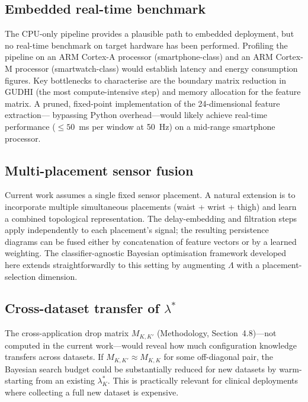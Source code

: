 \documentclass[onluarkali,ingilizce,yukseklisans,karton,LisansustuEgitim]{itutez}
\providecommand{\1}{\mathbf{1}}
\begin{document}
\subsection{Embedded real-time benchmark}

The CPU-only pipeline provides a plausible path to embedded deployment, but no
real-time benchmark on target hardware has been performed.  Profiling the pipeline
on an ARM Cortex-A processor (smartphone-class) and an ARM Cortex-M processor
(smartwatch-class) would establish latency and energy consumption figures.  Key
bottlenecks to characterise are the boundary matrix reduction in GUDHI (the
most compute-intensive step) and memory allocation for the feature matrix.  A
pruned, fixed-point implementation of the 24-dimensional feature extraction---
bypassing Python overhead---would likely achieve real-time performance ($\leq50$~ms
per window at 50~Hz) on a mid-range smartphone processor.

\subsection{Multi-placement sensor fusion}

Current work assumes a single fixed sensor placement.  A natural extension is to
incorporate multiple simultaneous placements (waist + wrist + thigh) and learn a
combined topological representation.  The delay-embedding and filtration steps apply
independently to each placement's signal; the resulting persistence diagrams can be
fused either by concatenation of feature vectors or by a learned weighting.  The
classifier-agnostic Bayesian optimisation framework developed here extends
straightforwardly to this setting by augmenting $\Lambda$ with a placement-selection
dimension.

\subsection{Cross-dataset transfer of $\lambda^*$}

The cross-application drop matrix $M_{K,K'}$ (Methodology, Section~4.8)---not
computed in the current work---would reveal how much configuration knowledge
transfers across datasets.  If $M_{K,K'}\approx M_{K,K}$ for some off-diagonal
pair, the Bayesian search budget could be substantially reduced for new datasets
by warm-starting from an existing $\lambda^*_K$.  This is practically relevant for
clinical deployments where collecting a full new dataset is expensive.
\end{document}
